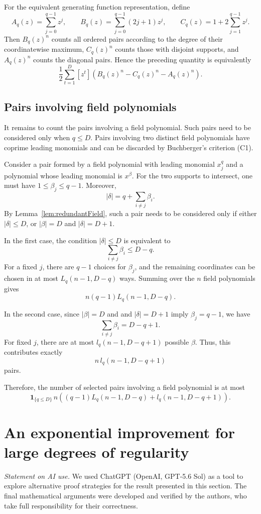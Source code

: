 \documentclass[a4paper, 12pt, oneside, openright]{article}
\begin{document}
For the equivalent generating function representation, define
\[
A_q(z)=\sum_{j=0}^{q-1}z^j,
\qquad
B_q(z)=\sum_{j=0}^{q-1}(2j+1)z^j,
\qquad
C_q(z)=1+2\sum_{j=1}^{q-1}z^j.
\]
Then $B_q(z)^n$ counts all ordered pairs according to the degree of their coordinatewise maximum, $C_q(z)^n$ counts those with disjoint supports, and $A_q(z)^n$ counts the diagonal pairs. Hence the preceding quantity is equivalently
\[
\frac12\sum_{t=1}^{D}
[z^t]\left(B_q(z)^n-C_q(z)^n-A_q(z)^n\right).
\]


\subsection{Pairs involving field polynomials}

It remains to count the pairs involving a field polynomial. Such pairs need to be considered only when $q\le D$.
Pairs involving two distinct field polynomials have coprime leading monomials and can be discarded by Buchberger's criterion (C1).

Consider a pair formed by a field polynomial with leading monomial $x_j^q$ and a polynomial whose leading monomial is $x^\beta$. For the two supports to intersect, one must have $1\le\beta_j\le q-1$. Moreover,
\[
|\delta|=q+\sum_{i\ne j}\beta_i.
\]
By Lemma~\ref{lem:redundantField}, such a pair needs to be considered only if either $|\delta|\le D$, or $|\beta|=D$ and $|\delta|= D+1$.

In the first case, the condition $|\delta|\le D$ is equivalent to
\[
\sum_{i\ne j}\beta_i\le D-q.
\]
For a fixed $j$, there are $q-1$ choices for $\beta_j$, and the remaining coordinates can be chosen in at most $L_q(n-1,D-q)$ ways. Summing over the $n$ field polynomials gives
\[
n(q-1)L_q(n-1,D-q).
\]

In the second case, since $|\beta|=D$ and and $|\delta|= D+1$ imply $\beta_j=q-1$, we have
\[
\sum_{i\ne j}\beta_i=D-q+1.
\]
For fixed $j$, there are at most $l_q(n-1,D-q+1)$ possible $\beta$. Thus, this contributes exactly
\[
n\,l_q(n-1,D-q+1)
\]
pairs.

Therefore, the number of selected pairs involving a field polynomial is at most
\[
\mathbf{1}_{\{q\le D\}}\,n
\left(
(q-1)L_q(n-1,D-q)
+l_q(n-1,D-q+1)
\right).
\]


\section{An exponential improvement for large degrees of regularity}
\label{app:largeD}
\noindent\textit{Statement on AI use.}
We used ChatGPT (OpenAI, GPT-5.6 Sol) as a tool to explore alternative proof strategies for the result presented in this section.
The final mathematical arguments were developed and verified by the authors, who take full responsibility for their correctness.
\end{document}
